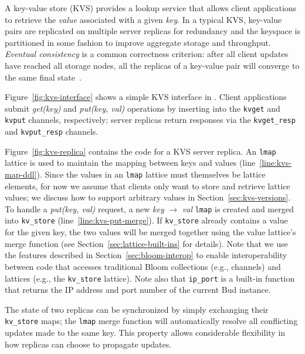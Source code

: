A key-value store (KVS) provides a lookup service that allows client
applications to retrieve the \emph{value} associated with a given \emph{key}. In
a typical KVS, key-value pairs are replicated on multiple server replicas for
redundancy and the keyspace is partitioned in some fashion to improve aggregate
storage and throughput. \emph{Eventual consistency} is a common correctness
criterion: after all client updates have reached all storage nodes, all the
replicas of a key-value pair will converge to the same final
state~\cite{Terry1995,vogels}.

Figure~\ref{fig:kvs-interface} shows a simple KVS interface in \lang. Client
applications submit \emph{get(key)} and \emph{put(key, val)} operations by
inserting into the \texttt{kvget} and \texttt{kvput} channels, respectively;
server replicas return responses via the \texttt{kvget\_resp} and
\texttt{kvput\_resp} channels.

Figure~\ref{fig:kvs-replica} contains the \lang code for a KVS server
replica. An \texttt{lmap} lattice is used to maintain the mapping between keys
and values (line~\ref{line:kvs-map-ddl}). Since the values in an \texttt{lmap}
lattice must themselves be lattice elements, for now we assume that clients only
want to store and retrieve lattice values; we discuss how to support arbitrary
values in Section~\ref{sec:kvs-versions}. To handle a \emph{put(key, val)}
request, a new \emph{key} $\to$ \emph{val} \texttt{lmap} is created and merged
into \texttt{kv\_store} (line~\ref{line:kvs-put-merge}). If \texttt{kv\_store}
already contains a value for the given key, the two values will be merged
together using the value lattice's merge function (see
Section~\ref{sec:lattice-built-ins} for details). Note that we use the \lang
features described in Section~\ref{sec:bloom-interop} to enable interoperability
between code that accesses traditional Bloom collections (e.g., channels) and
lattices (e.g., the \texttt{kv\_store} lattice).  Note also that
\texttt{ip\_port} is a built-in function that returns the IP address and port
number of the current Bud instance.

The state of two replicas can be synchronized by simply exchanging their
\texttt{kv\_store} maps; the \texttt{lmap} merge function will automatically
resolve all conflicting updates made to the same key. This property allows
considerable flexibility in how replicas can choose to propagate updates.

